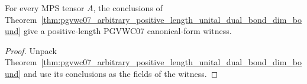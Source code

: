 \begin{theorem}%
    \label{thm:pgvwc07_positive_length_witness}
    \leanok
    For every MPS tensor $A$, the conclusions of
    Theorem~\ref{thm:pgvwc07_arbitrary_positive_length_unital_dual_bond_dim_bound}
    give a positive-length PGVWC07 canonical-form witness.
\end{theorem}
\begin{proof}\leanok
    Unpack
    Theorem~\ref{thm:pgvwc07_arbitrary_positive_length_unital_dual_bond_dim_bound}
    and use its conclusions as the fields of the witness.
\end{proof}
